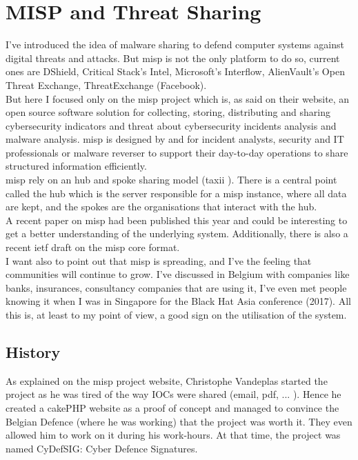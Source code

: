 \documentclass{eplmastersthesis}
\begin{document}
\section{MISP and Threat Sharing}
I've introduced the idea of malware sharing to defend computer systems against digital threats and attacks. But \gls{misp} is not the only platform to do so, current ones are DShield, Critical Stack’s Intel, Microsoft’s Interflow, AlienVault’s Open Threat Exchange, ThreatExchange (Facebook).\\
But here I focused only on the \gls{misp} project which is, as said on their website, an open source software solution for collecting, storing, distributing and sharing cybersecurity indicators and threat about cybersecurity incidents analysis and malware analysis. \gls{misp} is designed by and for incident analysts, security and IT professionals or malware reverser to support their day-to-day operations to share structured information efficiently.\\
\gls{misp} rely on an hub and spoke sharing model (\gls{taxii} \cite{taxiiWebsite}). There is a central point called the hub which is the server responsible for a \gls{misp} instance, where all data are kept, and the spokes are the organisations that interact with the hub.\\
A recent paper on \gls{misp} \cite{wagner2016misp} had been published this year and could be interesting to get a better understanding of the underlying system. Additionally, there is also a recent \gls{ietf} draft on the \gls{misp} core format\cite{MispDraft}.\\
I want also to point out that \gls{misp} is spreading, and I've the feeling that communities will continue to grow. I've discussed in Belgium with companies like banks, insurances, consultancy companies that are using it, I've even met people knowing it when I was in Singapore for the Black Hat Asia conference (2017). All this is, at least to my point of view, a good sign on the utilisation of the system.

\subsection{History}
As explained on the \gls{misp} project website, Christophe Vandeplas started the project as he was tired of the way IOCs were shared (email, pdf, ... ). Hence he created a cakePHP website as a proof of concept and managed to convince the Belgian Defence (where he was working) that the project was worth it. They even allowed him to work on it during his work-hours. At that time, the project was named CyDefSIG: Cyber Defence Signatures.\\
\end{document}

